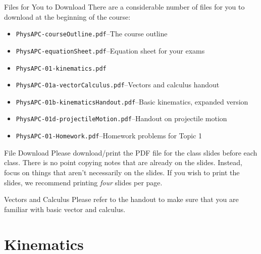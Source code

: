\documentclass[12pt,compress,aspectratio=169]{beamer}
\begin{document}
\begin{frame}{Files for You to Download}
  There are a considerable number of files for you to download at the beginning
  of the course:
  \begin{itemize}
  \item\texttt{PhysAPC-courseOutline.pdf}--The course outline
  \item\texttt{PhysAPC-equationSheet.pdf}--Equation sheet for your exams
  \item\texttt{PhysAPC-01-kinematics.pdf}
  \item\texttt{PhysAPC-01a-vectorCalculus.pdf}--Vectors and calculus handout
  \item\texttt{PhysAPC-01b-kinematicsHandout.pdf}--Basic kinematics, expanded
    version
  \item\texttt{PhysAPC-01d-projectileMotion.pdf}--Handout on projectile motion
  \item\texttt{PhysAPC-01-Homework.pdf}--Homework problems for Topic 1
  \end{itemize}
\end{frame}


\begin{frame}{File Download}
  Please download/print the PDF file for the class slides before
  each class. There is no point copying notes that are already on the slides.
  Instead, focus on things that aren't necessarily on the slides. If you wish
  to print the slides, we recommend printing \emph{four} slides per page.
\end{frame}



\begin{frame}{Vectors and Calculus}
  Please refer to the handout to make sure that you are familiar with
  basic vector and calculus.
\end{frame}



\section{Kinematics}
\end{document}
